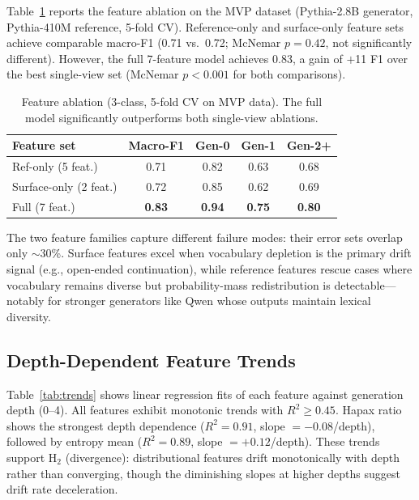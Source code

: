 \documentclass[letterpaper,11pt]{article}
\begin{document}
Table~\ref{tab:ablation} reports the feature ablation on the MVP dataset (Pythia-2.8B generator, Pythia-410M reference, 5-fold CV). Reference-only and surface-only feature sets achieve comparable macro-F1 (0.71 vs.\ 0.72; McNemar $p = 0.42$, not significantly different). However, the full 7-feature model achieves 0.83, a gain of $+$11 F1 over the best single-view set (McNemar $p < 0.001$ for both comparisons).

\begin{table}[t]
\centering
\caption{Feature ablation (3-class, 5-fold CV on MVP data). The full model significantly outperforms both single-view ablations.}
\label{tab:ablation}
\small
\begin{tabular}{lcccc}
\toprule
Feature set & Macro-F1 & Gen-0 & Gen-1 & Gen-2+ \\
\midrule
Ref-only (5 feat.) & 0.71 & 0.82 & 0.63 & 0.68 \\
Surface-only (2 feat.) & 0.72 & 0.85 & 0.62 & 0.69 \\
Full (7 feat.) & \textbf{0.83} & \textbf{0.94} & \textbf{0.75} & \textbf{0.80} \\
\bottomrule
\end{tabular}
\end{table}

The two feature families capture different failure modes: their error sets overlap only $\sim$30\%. Surface features excel when vocabulary depletion is the primary drift signal (e.g., open-ended continuation), while reference features rescue cases where vocabulary remains diverse but probability-mass redistribution is detectable---notably for stronger generators like Qwen whose outputs maintain lexical diversity.

\subsection{Depth-Dependent Feature Trends}
\label{sec:trends}

Table~\ref{tab:trends} shows linear regression fits of each feature against generation depth (0--4). All features exhibit monotonic trends with $R^2 \geq 0.45$. Hapax ratio shows the strongest depth dependence ($R^2 = 0.91$, slope $= -0.08$/depth), followed by entropy mean ($R^2 = 0.89$, slope $= +0.12$/depth). These trends support H$_2$ (divergence): distributional features drift monotonically with depth rather than converging, though the diminishing slopes at higher depths suggest drift rate deceleration.
\end{document}
